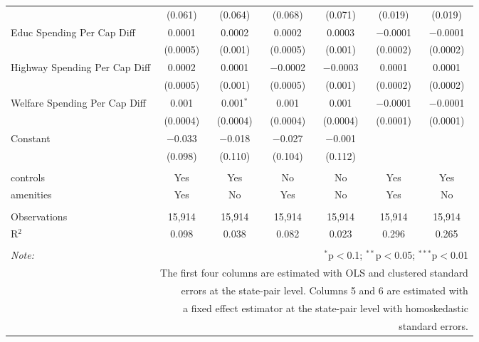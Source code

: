 \begin{table}[!htbp]
\begin{tabular}{@{\extracolsep{5pt}}lcccccc}
  & (0.061) & (0.064) & (0.068) & (0.071) & (0.019) & (0.019) \\ 
  Educ Spending Per Cap Diff & 0.0001 & 0.0002 & 0.0002 & 0.0003 & $-$0.0001 & $-$0.0001 \\ 
  & (0.0005) & (0.001) & (0.0005) & (0.001) & (0.0002) & (0.0002) \\ 
  Highway Spending Per Cap Diff & 0.0002 & 0.0001 & $-$0.0002 & $-$0.0003 & 0.0001 & 0.0001 \\ 
  & (0.0005) & (0.001) & (0.0005) & (0.001) & (0.0002) & (0.0002) \\ 
  Welfare Spending Per Cap Diff & 0.001 & 0.001$^{*}$ & 0.001 & 0.001 & $-$0.0001 & $-$0.0001 \\ 
  & (0.0004) & (0.0004) & (0.0004) & (0.0004) & (0.0001) & (0.0001) \\ 
  Constant & $-$0.033 & $-$0.018 & $-$0.027 & $-$0.001 &  &  \\ 
  & (0.098) & (0.110) & (0.104) & (0.112) &  &  \\ 
 \hline \\[-1.8ex] 
controls & Yes & Yes & No & No & Yes & Yes \\ 
amenities & Yes & No & Yes & No & Yes & No \\ 
\hline \\[-1.8ex] 
Observations & 15,914 & 15,914 & 15,914 & 15,914 & 15,914 & 15,914 \\ 
R$^{2}$ & 0.098 & 0.038 & 0.082 & 0.023 & 0.296 & 0.265 \\ 
\hline 
\hline \\[-1.8ex] 
\textit{Note:}  & \multicolumn{6}{r}{$^{*}$p$<$0.1; $^{**}$p$<$0.05; $^{***}$p$<$0.01} \\ 
 & \multicolumn{6}{r}{The first four columns are estimated with OLS and clustered standard} \\ 
 & \multicolumn{6}{r}{ errors at the state-pair level. Columns 5 and 6 are estimated with} \\ 
 & \multicolumn{6}{r}{a fixed effect estimator at the state-pair level with homoskedastic} \\ 
 & \multicolumn{6}{r}{standard errors.} \\ 
\end{tabular} 
\end{table} 
